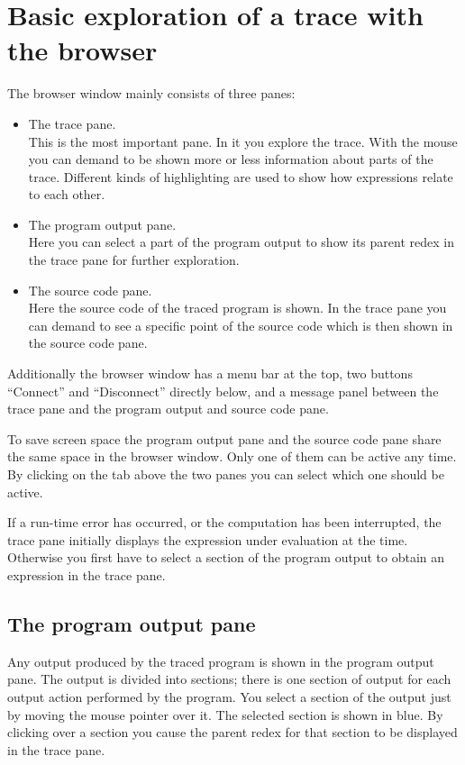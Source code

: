 \documentclass[12pt]{article}
\begin{document}
\section{Basic exploration of a trace with the browser}

The browser window mainly consists of three panes:

\begin{itemize}
\item The trace pane. \\
This is the most important pane. In it you explore the trace. With the mouse you can demand to be shown more or less information about parts of the trace. Different kinds of highlighting are used to show how expressions relate to each other.

\item The program output pane. \\
Here you can select a part of the program output to show its parent redex in the trace pane for further exploration.

\item The source code pane. \\
Here the source code of the traced program is shown. In the trace pane you can demand to see a specific point of the source code which is then shown in the source code pane.
\end{itemize}

Additionally the browser window has a menu bar at the top, two buttons ``Connect'' and ``Disconnect'' directly below, and a message panel between the trace pane and the program output and source code pane.

To save screen space the program output pane and the source code pane share the same space in the browser window. Only one of them can be active any time. By clicking on the tab above the two panes you can select which one should be active.

If a run-time error has occurred, or the computation has been interrupted,
the trace pane initially displays the expression under
evaluation at the time. Otherwise you first have to select a section of the program output to obtain an expression in the trace pane.

\subsection{The program output pane}

Any output produced by the traced program is shown in the program output pane.
The output is divided into sections; there is one section of output for each output action performed by the program. You select a section of the output just by moving the mouse pointer over it. The selected section is shown in blue.
By clicking over a section you cause the parent redex for that section to be displayed in the trace pane. 
\end{document}

